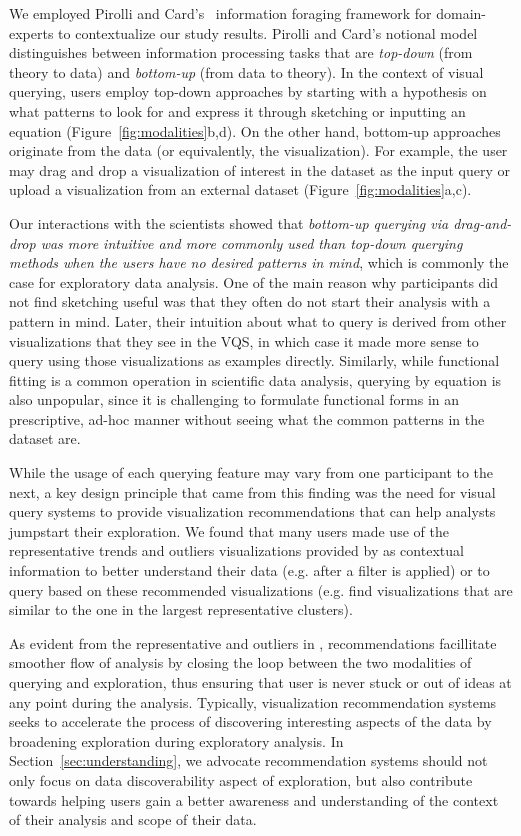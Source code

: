 \par We employed Pirolli and Card's~\cite{Pirolli} information foraging framework for domain-experts to contextualize our study results. Pirolli and Card's notional model distinguishes between information processing tasks that are \textit{top-down} (from theory to data) and \textit{bottom-up} (from data to theory). In the context of visual querying, users employ top-down approaches by starting with a hypothesis on what patterns to look for and express it through sketching or inputting an equation (Figure~\ref{fig:modalities}b,d). On the other hand, bottom-up approaches originate from the data (or equivalently, the visualization). For example, the user may drag and drop a visualization of interest in the dataset as the input query or upload a visualization from an external dataset (Figure~\ref{fig:modalities}a,c). 
\par Our interactions with the scientists showed that \emph{bottom-up querying via drag-and-drop was more intuitive and more commonly used than top-down querying methods when the users have no desired patterns in mind}, which is commonly the case for exploratory data analysis. One of the main reason why participants did not find sketching useful was that they often do not start their analysis with a pattern in mind. Later, their intuition about what to query is derived from other visualizations that they see in the VQS, in which case it made more sense to query using those visualizations as examples directly. Similarly, while functional fitting is a common operation in scientific data analysis, querying by equation is also unpopular, since it is challenging to formulate functional forms in an prescriptive, ad-hoc manner without seeing what the common patterns in the dataset are. 
\par While the usage of each querying feature may vary from one participant to the next, a key design principle that came from this finding was the need for visual query systems to provide visualization recommendations that can help analysts jumpstart their exploration. We found that many users made use of the representative trends and outliers visualizations provided by \zv as contextual information to better understand their data (e.g. after a filter is applied) or to query based on these recommended visualizations (e.g. find visualizations that are similar to the one in the largest representative clusters). 
\par As evident from the representative and outliers in \zv, recommendations facillitate smoother flow of analysis by closing the loop between the two modalities of querying and exploration, thus ensuring that user is never stuck or out of ideas at any point during the analysis. Typically, visualization recommendation systems seeks to accelerate the process of discovering interesting aspects of the data by broadening exploration during exploratory analysis. In Section~\ref{sec:understanding}, we advocate recommendation systems should not only focus on data discoverability aspect of exploration, but also contribute towards helping users gain a better awareness and understanding of the context of their analysis and scope of their data.

